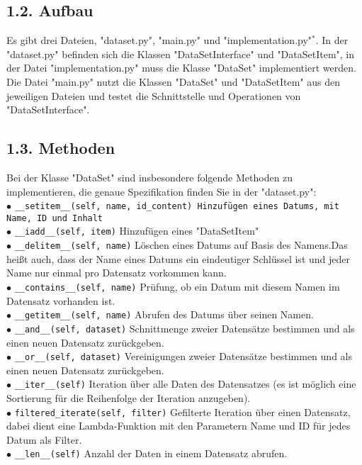 \documentclass[
 oneside, %
 12pt, %
 a4paper, %
 parskip=full %
]{scrartcl}
\begin{document}
\subsection*{1.2. Aufbau}
Es gibt drei Dateien, "dataset.py", "main.py" und "implementation.py"$^*$.
In der "dataset.py" befinden sich die Klassen "DataSetInterface" und "DataSetItem",
in der Datei "implementation.py" muss die Klasse "DataSet" implementiert werden.
Die Datei "main.py" nutzt die Klassen "DataSet" und "DataSetItem" aus den jeweiligen Dateien und testet die Schnittstelle und Operationen von "DataSetInterface".\\

\subsection*{1.3. Methoden}
Bei der Klasse "DataSet" sind insbesondere folgende Methoden zu implementieren, die genaue Spezifikation finden Sie in der "dataset.py":\\
$\bullet$ \texttt{\_\_setitem\_\_(self, name, id\_content) Hinzufügen eines Datums, mit Name, ID und Inhalt}\\
$\bullet$ \texttt{\_\_iadd\_\_(self, item)} Hinzufügen eines "DataSetItem"\\
$\bullet$ \texttt{\_\_delitem\_\_(self, name)} Löschen eines Datums auf Basis des Namens.Das heißt auch, dass der Name eines Datums ein eindeutiger Schlüssel ist und jeder Name nur einmal pro Datensatz vorkommen kann.\\
$\bullet$ \texttt{\_\_contains\_\_(self, name)} Prüfung, ob ein Datum mit diesem Namen im Datensatz vorhanden ist.\\
$\bullet$ \texttt{\_\_getitem\_\_(self, name)} Abrufen des Datums über seinen Namen.\\ 
$\bullet$ \texttt{\_\_and\_\_(self, dataset)} Schnittmenge zweier Datensätze bestimmen und als einen neuen Datensatz zurückgeben.\\
$\bullet$ \texttt{\_\_or\_\_(self, dataset)} Vereinigungen zweier Datensätze bestimmen und als einen neuen Datensatz zurückgeben.\\
$\bullet$ \texttt{\_\_iter\_\_(self)} Iteration über alle Daten des Datensatzes (es ist möglich eine Sortierung für die Reihenfolge der Iteration anzugeben).\\ 
$\bullet$ \texttt{filtered\_iterate(self, filter)} Gefilterte Iteration über einen Datensatz, dabei dient eine Lambda-Funktion mit den Parametern Name und ID für jedes Datum als Filter.\\
$\bullet$ \texttt{\_\_len\_\_(self)} Anzahl der Daten in einem Datensatz abrufen.
\end{document}
